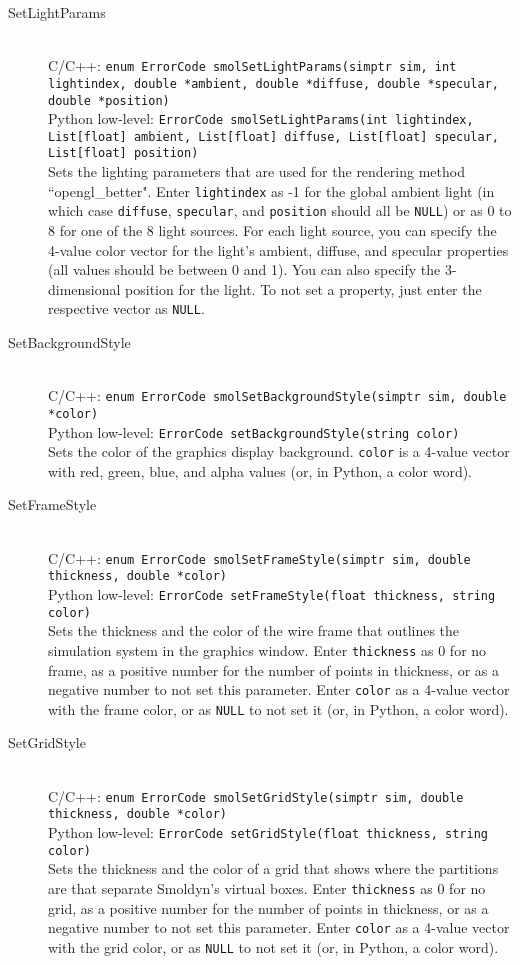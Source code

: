 \documentclass {book}
\newcommand {\ttt} {\texttt}
\begin{document}
\begin{description}
\item[SetLightParams]
\hfill \\
C/C++: \ttt{enum ErrorCode smolSetLightParams(simptr sim, int lightindex, double *ambient, double *diffuse, double *specular, double *position)}\\
Python low-level: \ttt{ErrorCode smolSetLightParams(int lightindex, List[float] ambient, List[float] diffuse, List[float] specular, List[float] position)}\\
Sets the lighting parameters that are used for the rendering method ``opengl\_better". Enter \ttt{lightindex} as -1 for the global ambient light (in which case \ttt{diffuse}, \ttt{specular}, and \ttt{position} should all be \ttt{NULL}) or as 0 to 8 for one of the 8 light sources. For each light source, you can specify the 4-value color vector for the light's ambient, diffuse, and specular properties (all values should be between 0 and 1). You can also specify the 3-dimensional position for the light. To not set a property, just enter the respective vector as \ttt{NULL}.

\item[SetBackgroundStyle]
\hfill \\
C/C++: \ttt{enum ErrorCode smolSetBackgroundStyle(simptr sim, double *color)}\\
Python low-level: \ttt{ErrorCode setBackgroundStyle(string color)}\\
Sets the color of the graphics display background. \ttt{color} is a 4-value vector with red, green, blue, and alpha values (or, in Python, a color word).

\item[SetFrameStyle]
\hfill \\
C/C++: \ttt{enum ErrorCode smolSetFrameStyle(simptr sim, double thickness, double *color)}\\
Python low-level: \ttt{ErrorCode setFrameStyle(float thickness, string color)}\\
Sets the thickness and the color of the wire frame that outlines the simulation system in the graphics window. Enter \ttt{thickness} as 0 for no frame, as a positive number for the number of points in thickness, or as a negative number to not set this parameter. Enter \ttt{color} as a 4-value vector with the frame color, or as \ttt{NULL} to not set it (or, in Python, a color word).

\item[SetGridStyle]
\hfill \\
C/C++: \ttt{enum ErrorCode smolSetGridStyle(simptr sim, double thickness, double *color)}\\
Python low-level: \ttt{ErrorCode setGridStyle(float thickness, string color)}\\
Sets the thickness and the color of a grid that shows where the partitions are that separate Smoldyn's virtual boxes. Enter \ttt{thickness} as 0 for no grid, as a positive number for the number of points in thickness, or as a negative number to not set this parameter. Enter \ttt{color} as a 4-value vector with the grid color, or as \ttt{NULL} to not set it (or, in Python, a color word).


\end{description}
\end{document}
